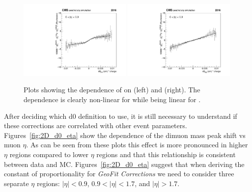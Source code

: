 \begin{figure}[h!]
    \centering
    \includegraphics[width=0.49\textwidth]{images_geofit/d0_PV_dpTOverpT2_eta_0_0p9.pdf}
    \includegraphics[width=0.49\textwidth]{images_geofit/d0_BS_dpTOverpT2_eta_0_0p9.pdf}
    \caption{Plots showing the dependence of \dptoverptsquare on \dzeroPV (left) and \dzeroBS (right). The dependence is clearly non-linear for \dzeroPV while being linear for \dzeroBS.}
    \label{fig:d0_dpTOverpT2_inclusive}
\end{figure}

After deciding which d0 definition to use, it is still necessary to understand if these corrections are correlated with other event parameters. Figures~\ref{fig:2D_d0_eta} show the dependence of the dimuon mass peak shift vs muon $\eta$. As can be seen from these plots this effect is more pronounced in higher $\eta$ regions compared to lower $\eta$ regions and that this relationship is consistent between data and MC. Figures~\ref{fig:2D_d0_eta} suggest that when deriving the constant of proportionality for \textit{GeoFit Corrections} we need to consider three separate $\eta$ regions: $|\eta| < 0.9$, $0.9 < |\eta| < 1.7$, and $|\eta| > 1.7$.  

